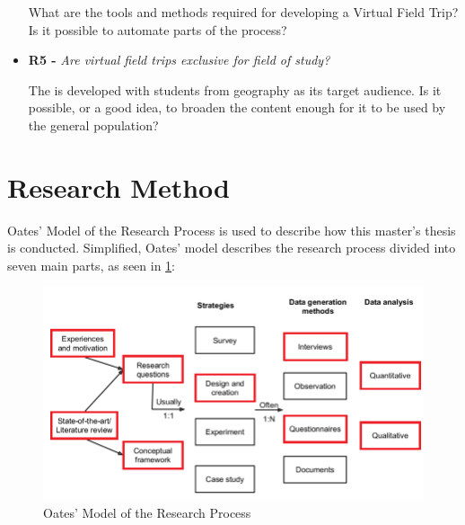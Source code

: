 \begin{itemize}
        What are the tools and methods required for developing a Virtual Field Trip? Is it possible to automate parts of the process?
    
        \SPACE
        
        
        
        \item \textbf{R5 - } \emph{Are virtual field trips exclusive for field of study?}
        
        The \ApplicationName \hspace{0.1cm} is developed with students from geography as its target audience. Is it possible, or a good idea, to broaden the content enough for it to be used by the general population?
    \end{itemize}
    
    

\section{Research Method}
    Oates'\cite{research} Model of the Research Process is used to describe how this master's thesis is conducted. Simplified, Oates' model describes the research process divided into seven main parts, as seen in \cref{fig:oates}:
    
    \FloatBarrier
    \begin{figure}[htbp]
        \centering
        \includegraphics[width=\ImageWidth]{figures/oates_highlighted.png}
        \caption{Oates' Model of the Research Process}
        \label{fig:oates}
    \end{figure}
    \FloatBarrier
    
